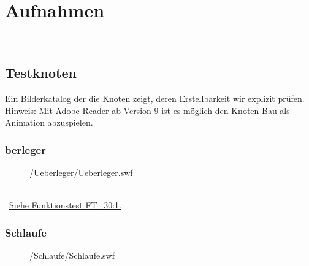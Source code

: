 %



\section{Aufnahmen}
\label{Anhang:Aufnahmen}


~\\



\newpage




\subsection{Testknoten}

Ein Bilderkatalog der die Knoten zeigt, deren Erstellbarkeit wir explizit prüfen. Hinweis: Mit Adobe Reader ab Version 9 ist es möglich den Knoten-Bau als Animation abzuspielen.\\


	\subsubsection*{berleger\grqq}
	
		\begin{figure}[!h]
		
			\label{Abb:Test-Knoten:Ueberleger}
			\centering	
			
			{\testknots/Ueberleger/Ueberleger.swf}
			
		\end{figure}
		
		~\\\mousecursor~\hyperref[FT:30:Ueberleger]{Siehe Funktionstest FT\_30:1.} 
	
	
\clearpage	


	\subsubsection*{\glqq Schlaufe\grqq}	
	
		\begin{figure}[!h]
		
			\label{Abb:Test-Knoten:Schlaufe}
			\centering	
			
			{\testknots/Schlaufe/Schlaufe.swf}
			
		\end{figure}
		
